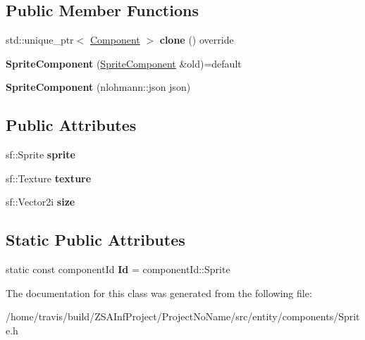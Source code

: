 \subsection*{Public Member Functions}
\begin{DoxyCompactItemize}
\item 
\hypertarget{classSpriteComponent_a9f3d289105de1bfd5679b1f0095f2a37}{std\-::unique\-\_\-ptr$<$ \hyperlink{classComponent}{Component} $>$ {\bfseries clone} () override}\label{classSpriteComponent_a9f3d289105de1bfd5679b1f0095f2a37}

\item 
\hypertarget{classSpriteComponent_ad0ee9b504468905b0232f53c87a0d5dc}{{\bfseries Sprite\-Component} (\hyperlink{classSpriteComponent}{Sprite\-Component} \&old)=default}\label{classSpriteComponent_ad0ee9b504468905b0232f53c87a0d5dc}

\item 
\hypertarget{classSpriteComponent_a108d41a569c938928920886ac205785d}{{\bfseries Sprite\-Component} (nlohmann\-::json json)}\label{classSpriteComponent_a108d41a569c938928920886ac205785d}

\end{DoxyCompactItemize}
\subsection*{Public Attributes}
\begin{DoxyCompactItemize}
\item 
\hypertarget{classSpriteComponent_ac49ac20d7050d549b853b97c43790164}{sf\-::\-Sprite {\bfseries sprite}}\label{classSpriteComponent_ac49ac20d7050d549b853b97c43790164}

\item 
\hypertarget{classSpriteComponent_a60a5b6b5e855d1cc9ed87d4ea1762f99}{sf\-::\-Texture {\bfseries texture}}\label{classSpriteComponent_a60a5b6b5e855d1cc9ed87d4ea1762f99}

\item 
\hypertarget{classSpriteComponent_a12da3a2d88705372ca6adfe18f26fbda}{sf\-::\-Vector2i {\bfseries size}}\label{classSpriteComponent_a12da3a2d88705372ca6adfe18f26fbda}

\end{DoxyCompactItemize}
\subsection*{Static Public Attributes}
\begin{DoxyCompactItemize}
\item 
\hypertarget{classSpriteComponent_acc8a12da18e2b079a0364ab7c9c64a97}{static const component\-Id {\bfseries Id} = component\-Id\-::\-Sprite}\label{classSpriteComponent_acc8a12da18e2b079a0364ab7c9c64a97}

\end{DoxyCompactItemize}


The documentation for this class was generated from the following file\-:\begin{DoxyCompactItemize}
\item 
/home/travis/build/\-Z\-S\-A\-Inf\-Project/\-Project\-No\-Name/src/entity/components/Sprite.\-h\end{DoxyCompactItemize}
